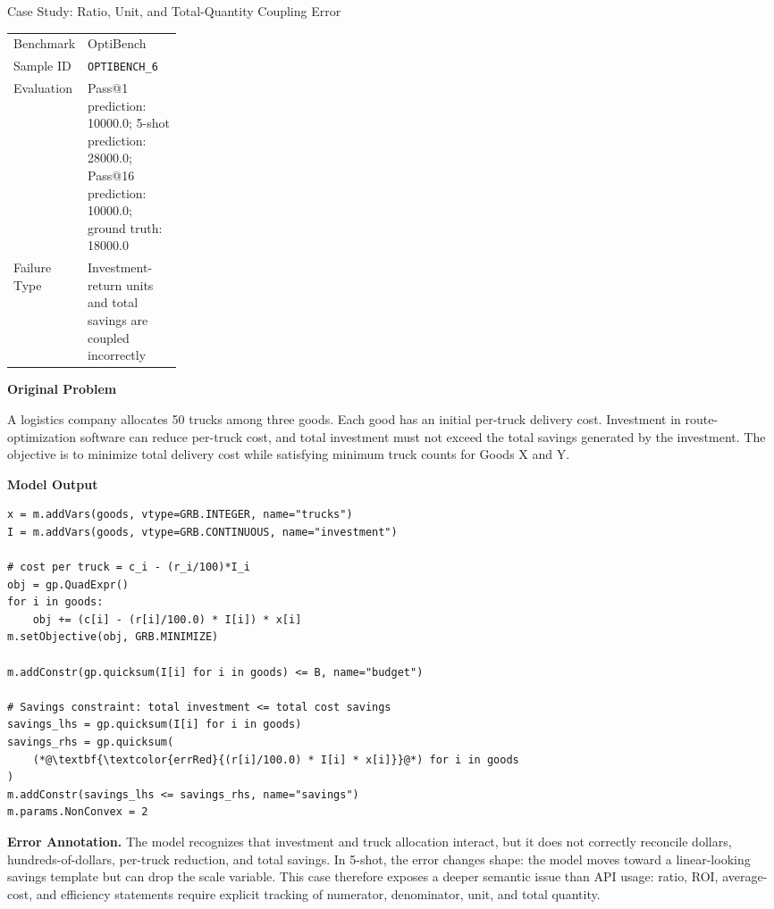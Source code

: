 \begin{casepage}{Case Study: Ratio, Unit, and Total-Quantity Coupling Error}

\begin{tabularx}{\linewidth}{@{}p{0.22\linewidth}X@{}}
\toprule
Benchmark & OptiBench \\
Sample ID & \texttt{OPTIBENCH\_6} \\
Evaluation & Pass@1 prediction: 10000.0; 5-shot prediction: 28000.0; Pass@16 prediction: 10000.0; ground truth: 18000.0 \\
Failure Type & Investment-return units and total savings are coupled incorrectly \\
\bottomrule
\end{tabularx}

\vspace{0.5em}
\textbf{Original Problem}

{\small
A logistics company allocates 50 trucks among three goods. Each good has an
initial per-truck delivery cost. Investment in route-optimization software can
reduce per-truck cost, and total investment must not exceed the total savings
generated by the investment. The objective is to minimize total delivery cost
while satisfying minimum truck counts for Goods X and Y.
\par}

\vspace{0.5em}
\textbf{Model Output}

\begin{lstlisting}[style=pythoncase]
x = m.addVars(goods, vtype=GRB.INTEGER, name="trucks")
I = m.addVars(goods, vtype=GRB.CONTINUOUS, name="investment")

# cost per truck = c_i - (r_i/100)*I_i
obj = gp.QuadExpr()
for i in goods:
    obj += (c[i] - (r[i]/100.0) * I[i]) * x[i]
m.setObjective(obj, GRB.MINIMIZE)

m.addConstr(gp.quicksum(I[i] for i in goods) <= B, name="budget")

# Savings constraint: total investment <= total cost savings
savings_lhs = gp.quicksum(I[i] for i in goods)
savings_rhs = gp.quicksum(
    (*@\textbf{\textcolor{errRed}{(r[i]/100.0) * I[i] * x[i]}}@*) for i in goods
)
m.addConstr(savings_lhs <= savings_rhs, name="savings")
m.params.NonConvex = 2
\end{lstlisting}

\vspace{0.3em}
\textbf{Error Annotation.}
The model recognizes that investment and truck allocation interact, but it does
not correctly reconcile dollars, hundreds-of-dollars, per-truck reduction, and
total savings. In 5-shot, the error changes shape: the model moves toward a
linear-looking savings template but can drop the scale variable. This case
therefore exposes a deeper semantic issue than API usage: ratio, ROI,
average-cost, and efficiency statements require explicit tracking of numerator,
denominator, unit, and total quantity.

\end{casepage}

